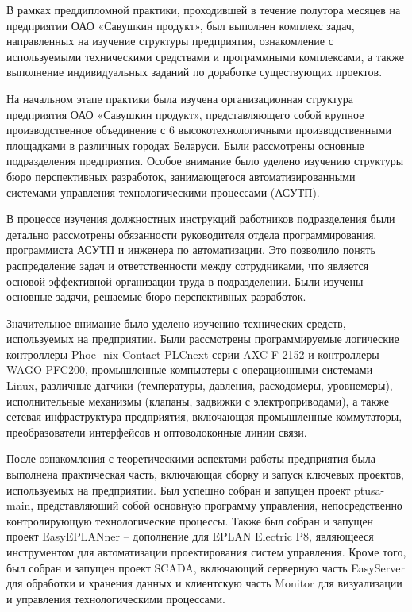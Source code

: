 {\gostFont

\par \redline В рамках преддипломной практики, проходившей в течение полутора месяцев на предприятии ОАО «Савушкин продукт», был выполнен комплекс задач, направленных на изучение структуры предприятия, ознакомление с используемыми техническими средствами и программными комплексами, а также выполнение индивидуальных заданий по доработке существующих проектов.

\par \redline На начальном этапе практики была изучена организационная структура предприятия ОАО «Савушкин продукт», представляющего собой крупное производственное объединение с 6 высокотехнологичными производственными площадками в различных городах Беларуси. Были рассмотрены основные подразделения предприятия. Особое внимание было уделено изучению структуры бюро перспективных разработок, занимающегося автоматизированными системами управления технологическими процессами (АСУТП).

\par \redline В процессе изучения должностных инструкций работников подразделения были детально рассмотрены обязанности руководителя отдела программирования, программиста АСУТП и инженера по автоматизации. Это позволило понять распределение задач и ответственности между сотрудниками, что является основой эффективной организации труда в подразделении. Были изучены основные задачи, решаемые бюро перспективных разработок.

\par \redline Значительное внимание было уделено изучению технических средств, используемых на предприятии. Были рассмотрены программируемые логические контроллеры Phoe- nix Contact PLCnext серии AXC F 2152 и контроллеры WAGO PFC200, промышленные компьютеры с операционными системами Linux, различные датчики (температуры, давления, расходомеры, уровнемеры), исполнительные механизмы (клапаны, задвижки с электроприводами), а также сетевая инфраструктура предприятия, включающая промышленные коммутаторы, преобразователи интерфейсов и оптоволоконные линии связи.

\par \redline После ознакомления с теоретическими аспектами работы предприятия была выполнена практическая часть, включающая сборку и запуск ключевых проектов, используемых на предприятии. Был успешно собран и запущен проект ptusa-main, представляющий собой основную программу управления, непосредственно контролирующую технологические процессы. Также был собран и запущен проект EasyEPLANner – дополнение для EPLAN Electric P8, являющееся инструментом для автоматизации проектирования систем управления. Кроме того, был собран и запущен проект SCADA, включающий серверную часть EasyServer для обработки и хранения данных и клиентскую часть Monitor для визуализации и управления технологическими процессами.

}

